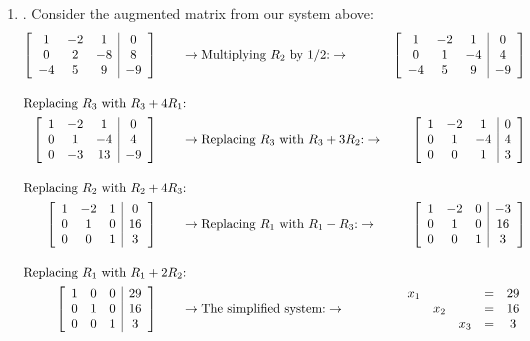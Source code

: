 \documentclass[12pt]{article}
\begin{document}
\begin{enumerate}
\begin{enumerate}
	\item\underline{}.
		Consider the augmented matrix from our system above:
			\begin{align*}
				\left[\begin{array}{c c c | c}
				1	&-2	&1	&0	\\
				0	&2	&-8	&8	\\
				-4	&5	&9	&-9
				\end{array}\right]
			&\hspace{20pt}\rightarrow\text{Multiplying $R_2$ by 1/2:}\rightarrow
				& \left[\begin{array}{c c c | c}
				1	&-2	&1	&0	\\
				0	&1	&-4	&4	\\
				-4	&5	&9	&-9
				\end{array}\right]\\[10pt]
			\intertext{Replacing $R_3$ with $R_3+4R_1$:}
				\left[\begin{array}{c c c | c}
				1	&-2	&1	&0	\\
				0	&1	&-4	&4	\\
				0	&-3	&13	&-9
				\end{array}\right]
			&\hspace{20pt}\rightarrow\text{Replacing $R_3$ with $R_3+3R_2$:}\rightarrow
				& \left[\begin{array}{c c c | c}
				1	&-2	&1	&0	\\
				0	&1	&-4	&4	\\
				0	&0	&1	&3
				\end{array}\right]\\[10pt]
			\intertext{Replacing $R_2$ with $R_2+4R_3$:}
				\left[\begin{array}{c c c | c}
				1	&-2	&1	&0	\\
				0	&1	&0	&16	\\
				0	&0	&1	&3
				\end{array}\right]
			&\hspace{20pt}\rightarrow\text{Replacing $R_1$ with $R_1-R_3$:}\rightarrow
				& \left[\begin{array}{c c c | c}
				1	&-2	&0	&-3	\\
				0	&1	&0	&16	\\
				0	&0	&1	&3
				\end{array}\right]\\[10pt]
			\intertext{Replacing $R_1$ with $R_1+2R_2$:}
				\left[\begin{array}{c c c | c}
				1	&0	&0	&29	\\
				0	&1	&0	&16	\\
				0	&0	&1	&3
				\end{array}\right]
			&\hspace{20pt}\rightarrow\text{The simplified system:}\rightarrow&\begin{array}{c c c c c}
				x_1	&	&	&=	&29	\\
					&x_2	&	&=	&16	\\
					&	&x_3	&=	&3
				\end{array}
			\end{align*}


\end{enumerate}
\end{enumerate}
\end{document}
